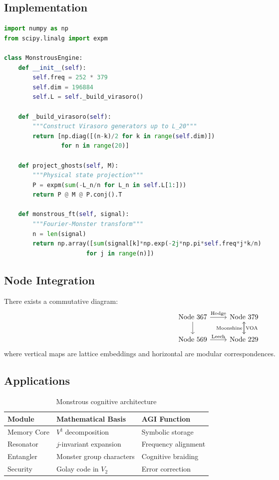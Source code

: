 \documentclass[12pt]{article}
\begin{document}
\subsection{Implementation}
\begin{lstlisting}[language=Python,caption={Monstrous Spine Engine}]
import numpy as np
from scipy.linalg import expm

class MonstrousEngine:
    def __init__(self):
        self.freq = 252 * 379
        self.dim = 196884
        self.L = self._build_virasoro()
        
    def _build_virasoro(self):
        """Construct Virasoro generators up to L_20"""
        return [np.diag([(n-k)/2 for k in range(self.dim)]) 
                for n in range(20)]
    
    def project_ghosts(self, M):
        """Physical state projection"""
        P = expm(sum(-L_n/n for L_n in self.L[1:]))
        return P @ M @ P.conj().T
    
    def monstrous_ft(self, signal):
        """Fourier-Monster transform"""
        n = len(signal)
        return np.array([sum(signal[k]*np.exp(-2j*np.pi*self.freq*j*k/n)
                       for j in range(n)])
\end{lstlisting}

\subsection{Node Integration}
\begin{theorem}
There exists a commutative diagram:
\[
\begin{tikzcd}
\text{Node 367} \ar[r, "\text{Hodge}"] \ar[d] & \text{Node 379} \ar[d, "\text{VOA}"] \\
\text{Node 569} \ar[r, "\text{Leech}"] & \text{Node 229} \ar[u, "\text{Moonshine}"]
\end{tikzcd}
\]
where vertical maps are lattice embeddings and horizontal are modular correspondences.
\end{theorem}

\subsection{Applications}
\begin{table}[h]
\centering
\begin{tabular}{lll}
\toprule
\textbf{Module} & \textbf{Mathematical Basis} & \textbf{AGI Function} \\
\midrule
Memory Core & $V^\natural$ decomposition & Symbolic storage \\
Resonator & $j$-invariant expansion & Frequency alignment \\
Entangler & Monster group characters & Cognitive braiding \\
Security & Golay code in $V_2$ & Error correction \\
\bottomrule
\end{tabular}
\caption{Monstrous cognitive architecture}
\end{table}
\end{document}
